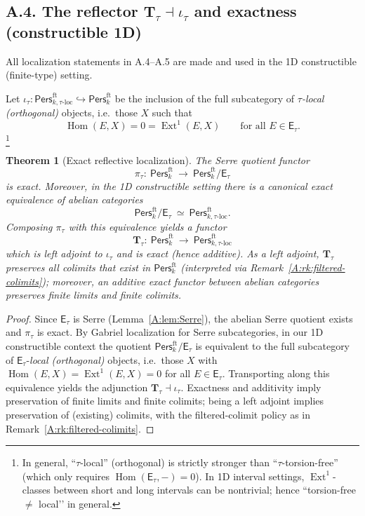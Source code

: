 \documentclass[11pt]{article}
\DeclareMathOperator{\Ext}{Ext}
\DeclareMathOperator{\Hom}{Hom}
\newcommand{\Pers}{\mathsf{Pers}}
\numberwithin{equation}{section}
\newtheorem{theorem}{Theorem}[section]
\theoremstyle{definition}
\begin{document}
\subsection*{A.4. The reflector \texorpdfstring{$\mathbf{T}_\tau\dashv\iota_\tau$}{T\_\tau ⊣ ι\_\tau} and exactness (constructible 1D)}
All localization statements in A.4–A.5 are made and used in the 1D constructible (finite-type) setting.

Let \(\iota_\tau:\Pers^{\mathrm{ft}}_{k,\tau\text{-loc}}\hookrightarrow\Pers^{\mathrm{ft}}_k\) be the inclusion of the full subcategory of \emph{\(\tau\)-local (orthogonal)} objects, i.e.\ those \(X\) such that
\[
\Hom(E,X)=0=\Ext^1(E,X)\qquad\text{for all }E\in\mathsf{E}_\tau.
\]
\footnote{In general, “\(\tau\)-local” (orthogonal) is strictly stronger than “\(\tau\)-torsion-free” (which only requires \(\Hom(\mathsf{E}_\tau,-)=0\)).
In 1D interval settings, \(\Ext^1\)-classes between short and long intervals can be nontrivial; hence “torsion-free \(\neq\) local’’ in general.}

\begin{theorem}[Exact reflective localization]\label{A:thm:localization}
The Serre quotient functor
\[
\pi_\tau:\ \Pers^{\mathrm{ft}}_k\ \longrightarrow\ \Pers^{\mathrm{ft}}_k/\mathsf{E}_\tau
\]
is exact. Moreover, in the 1D constructible setting there is a canonical exact equivalence of abelian categories
\[
\Pers^{\mathrm{ft}}_k/\mathsf{E}_\tau \ \simeq\ \Pers^{\mathrm{ft}}_{k,\tau\text{-loc}}.
\]
Composing \(\pi_\tau\) with this equivalence yields a functor
\[
\mathbf{T}_\tau:\ \Pers^{\mathrm{ft}}_k\ \longrightarrow\ \Pers^{\mathrm{ft}}_{k,\tau\text{-loc}}
\]
which is left adjoint to \(\iota_\tau\) and is exact (hence additive).
As a left adjoint, \(\mathbf{T}_\tau\) preserves all colimits that exist in \(\Pers^{\mathrm{ft}}_k\) (interpreted via Remark~\ref{A:rk:filtered-colimits});
moreover, an additive exact functor between abelian categories preserves \emph{finite limits and finite colimits}.
\end{theorem}

\begin{proof}
Since \(\mathsf{E}_\tau\) is Serre (Lemma~\ref{A:lem:Serre}), the abelian Serre quotient exists and \(\pi_\tau\) is exact.
By Gabriel localization for Serre subcategories, in our 1D constructible context the quotient \(\Pers^{\mathrm{ft}}_k/\mathsf{E}_\tau\) is equivalent to the full subcategory of \(\mathsf{E}_\tau\)-\emph{local (orthogonal)} objects, i.e.\ those \(X\) with \(\Hom(E,X)=\Ext^1(E,X)=0\) for all \(E\in\mathsf{E}_\tau\).
Transporting along this equivalence yields the adjunction \(\mathbf{T}_\tau\dashv\iota_\tau\).
Exactness and additivity imply preservation of finite limits and finite colimits; being a left adjoint implies preservation of (existing) colimits, with the filtered-colimit policy as in Remark~\ref{A:rk:filtered-colimits}.
\end{proof}
\end{document}
